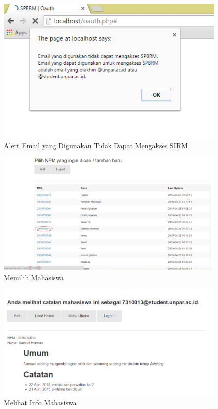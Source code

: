 \begin{figure}[H]
\centering
\includegraphics[scale=0.5]{Gambar/pengujian7.png}
\caption[Alert Email yang Digunakan Tidak Dapat Mengakses SIRM]{Alert Email yang
Digunakan Tidak Dapat Mengakses SIRM}
\label{fig:alert}
\end{figure}

\begin{figure}[H]
\centering
\includegraphics[scale=0.45]{Gambar/pengujian8.png}
\caption[Memilih Mahasiswa]{Memilih Mahasiswa} 
\label{fig:memilihmahasiswa}
\end{figure}

\begin{figure}[H]
\centering
\includegraphics[scale=0.5]{Gambar/pengujian9.png}
\caption[Melihat Info Mahasiswa]{Melihat Info Mahasiswa} 
\label{fig:melihatinfomahasiswa}
\end{figure}

